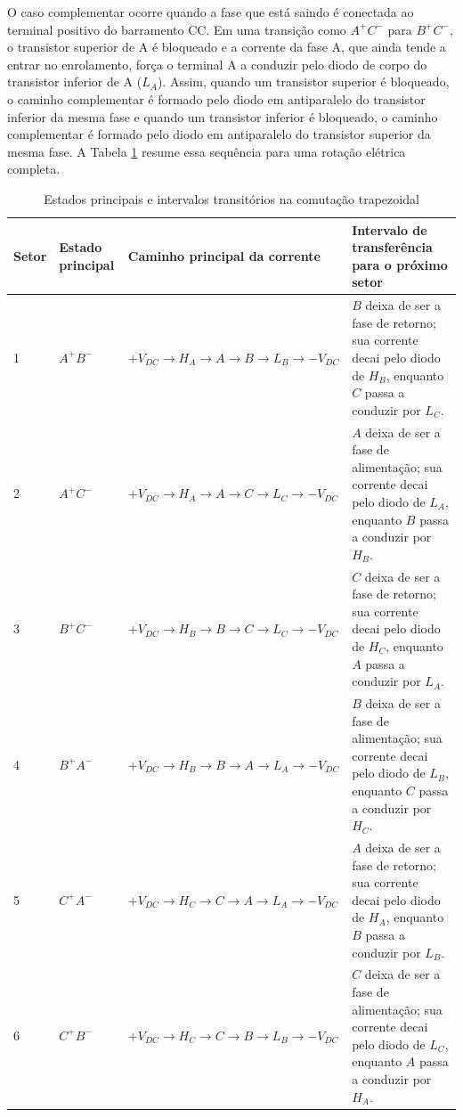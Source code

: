O caso complementar ocorre quando a fase que está saindo é conectada ao terminal positivo do barramento CC. Em uma transição como $A^+C^-$ para $B^+C^-$, o transistor superior de A é bloqueado e a corrente da fase A, que ainda tende a entrar no enrolamento, força o terminal A a conduzir pelo diodo de corpo do transistor inferior de A ($L_A$). Assim, quando um transistor superior é bloqueado, o caminho complementar é formado pelo diodo em antiparalelo do transistor inferior da mesma fase e quando um transistor inferior é bloqueado, o caminho complementar é formado pelo diodo em antiparalelo do transistor superior da mesma fase. A Tabela \ref{tab:subintervalos_comutacao_6step} resume essa sequência para uma rotação elétrica completa.

\begin{table}[H]
\centering
\caption{Estados principais e intervalos transitórios na comutação trapezoidal}
\label{tab:subintervalos_comutacao_6step}
\small
\begin{tabular}{@{}p{1.5cm}p{2.2cm}p{4.3cm}p{5.1cm}@{}}
\toprule
Setor & Estado principal & Caminho principal da corrente & Intervalo de transferência para o próximo setor \\
\midrule
1 & $A^+B^-$ & $+V_{DC} \rightarrow H_A \rightarrow A \rightarrow B \rightarrow L_B \rightarrow -V_{DC}$ & $B$ deixa de ser a fase de retorno; sua corrente decai pelo diodo de $H_B$, enquanto $C$ passa a conduzir por $L_C$. \\
2 & $A^+C^-$ & $+V_{DC} \rightarrow H_A \rightarrow A \rightarrow C \rightarrow L_C \rightarrow -V_{DC}$ & $A$ deixa de ser a fase de alimentação; sua corrente decai pelo diodo de $L_A$, enquanto $B$ passa a conduzir por $H_B$. \\
3 & $B^+C^-$ & $+V_{DC} \rightarrow H_B \rightarrow B \rightarrow C \rightarrow L_C \rightarrow -V_{DC}$ & $C$ deixa de ser a fase de retorno; sua corrente decai pelo diodo de $H_C$, enquanto $A$ passa a conduzir por $L_A$. \\
4 & $B^+A^-$ & $+V_{DC} \rightarrow H_B \rightarrow B \rightarrow A \rightarrow L_A \rightarrow -V_{DC}$ & $B$ deixa de ser a fase de alimentação; sua corrente decai pelo diodo de $L_B$, enquanto $C$ passa a conduzir por $H_C$. \\
5 & $C^+A^-$ & $+V_{DC} \rightarrow H_C \rightarrow C \rightarrow A \rightarrow L_A \rightarrow -V_{DC}$ & $A$ deixa de ser a fase de retorno; sua corrente decai pelo diodo de $H_A$, enquanto $B$ passa a conduzir por $L_B$. \\
6 & $C^+B^-$ & $+V_{DC} \rightarrow H_C \rightarrow C \rightarrow B \rightarrow L_B \rightarrow -V_{DC}$ & $C$ deixa de ser a fase de alimentação; sua corrente decai pelo diodo de $L_C$, enquanto $A$ passa a conduzir por $H_A$. \\
\bottomrule
\end{tabular}
\end{table}

